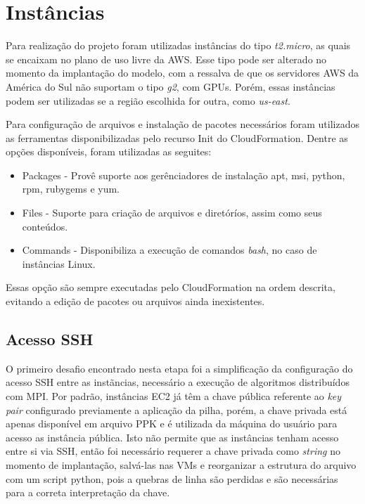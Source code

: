 \documentclass[tg]{mdtufsm}
\begin{document}
\section{Instâncias}

Para realização do projeto foram utilizadas instâncias do tipo \emph{t2.micro}, as quais se encaixam no plano de uso livre da AWS. Esse tipo pode ser alterado no momento da implantação do modelo, com a ressalva de que os servidores AWS da América do Sul não suportam o tipo \emph{g2}, com GPUs. Porém, essas instâncias podem ser utilizadas se a região escolhida for outra, como \emph{us-east}.

Para configuração de arquivos e instalação de pacotes necessários foram utilizados as ferramentas disponibilizadas pelo recurso Init do CloudFormation. Dentre as opções disponíveis, foram utilizadas as seguites:

\begin{itemize}
\item Packages - Provê suporte aos gerênciadores de instalação apt, msi, python, rpm, rubygems e yum. 
\item Files - Suporte para criação de arquivos e diretóríos, assim como seus conteúdos.
\item Commands - Disponibiliza a execução de comandos \emph{bash}, no caso de instâncias Linux.
\end{itemize}

Essas opção são sempre executadas pelo CloudFormation na ordem descrita, evitando a edição de pacotes ou arquivos ainda inexistentes.

\subsection{Acesso SSH}

O primeiro desafio encontrado nesta etapa foi a simplificação da configuração do acesso SSH entre as instãncias, necessário a execução de algoritmos distribuídos com MPI. Por padrão, instâncias EC2 já têm a chave pública referente ao \emph{key pair} configurado previamente a aplicação da pilha, porém, a chave privada está apenas disponível em arquivo PPK e é utilizada da máquina do usuário para acesso as instância pública. Isto não permite que as instâncias tenham acesso entre si via SSH, então foi necessário requerer a chave privada como \emph{string} no momento de implantação, salvá-las nas VMs e reorganizar a estrutura do arquivo com um script python, pois a quebras de linha são perdidas e são necessárias para a correta interpretação da chave.
\end{document}

